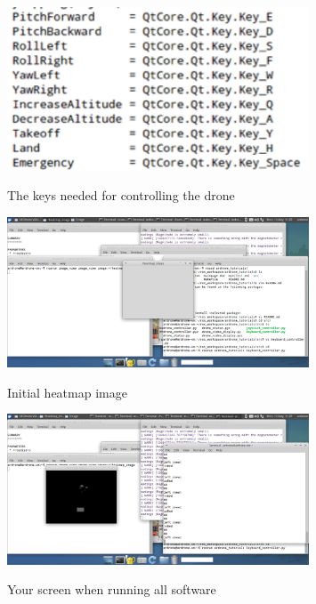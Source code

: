 \documentclass[a4paper,10pt]{article}
\begin{document}
\begin{figure}[h!]
	\caption{The keys needed for controlling the drone}
	\centering
	\includegraphics[width=0.8\textwidth]{images/keysforcontrol}
	\label{fig:keysforcontrol}
\end{figure}

\begin{figure}[h!]
	\caption{Initial heatmap image}
	\centering
	\includegraphics[width=0.8\textwidth]{images/heatmapterminal}
	\label{fig:heatmapterminal}
\end{figure}

\begin{figure}[h!]
	\caption{Your screen when running all software}
	\centering
	\includegraphics[width=0.8\textwidth]{images/totalpicture}
	\label{fig:totalpicture}
\end{figure}
\end{document}
